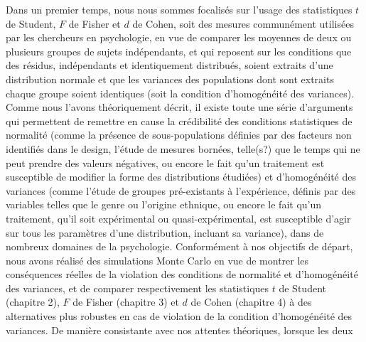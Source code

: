 \documentclass[
  12pt,
  french,
]{article}
\begin{document}
Dans un premier temps, nous nous sommes focalisés sur l'usage des
statistiques \(t\) de Student, \(F\) de Fisher et \(d\) de Cohen, soit
des mesures communément utilisées par les chercheurs en psychologie, en
vue de comparer les moyennes de deux ou plusieurs groupes de sujets
indépendants, et qui reposent sur les conditions que des résidus,
indépendants et identiquement distribués, soient extraits d'une
distribution normale et que les variances des populations dont sont
extraits chaque groupe soient identiques (soit la condition
d'homogénéité des variances). Comme nous l'avons théoriquement décrit,
il existe toute une série d'arguments qui permettent de remettre en
cause la crédibilité des conditions statistiques de normalité (comme la
présence de sous-populations définies par des facteurs non identifiés
dans le design, l'étude de mesures bornées, telle(s?) que le temps qui
ne peut prendre des valeurs négatives, ou encore le fait qu'un
traitement est susceptible de modifier la forme des distributions
étudiées) et d'homogénéité des variances (comme l'étude de groupes
pré-existants à l'expérience, définis par des variables telles que le
genre ou l'origine
ethnique,
ou encore le fait qu'un traitement, qu'il soit expérimental ou
quasi-expérimental, est susceptible d'agir sur tous les paramètres d'une
distribution, incluant sa variance), dans de nombreux domaines de la
psychologie. Conformément à nos objectifs de départ, nous avons réalisé
des simulations Monte Carlo en vue de montrer les conséquences réelles
de la violation des conditions de normalité et d'homogénéité des
variances, et de comparer respectivement les statistiques \(t\) de
Student (chapitre 2), \(F\) de Fisher (chapitre 3) et \(d\) de Cohen
(chapitre 4) à des alternatives plus robustes en cas de violation de la
condition d'homogénéité des
variances.
De manière consistante avec nos attentes théoriques, lorsque les deux
\end{document}
